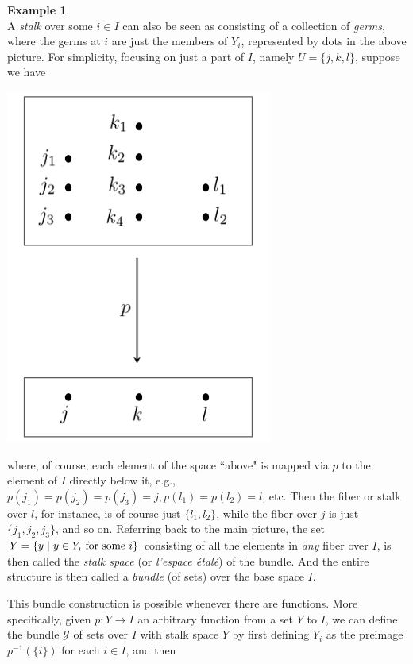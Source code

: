\documentclass[11pt]{book}
\theoremstyle{definition}
\newtheorem{example}{Example}[section]
\theoremstyle{definition}
\theoremstyle{definition}
\theoremstyle{theorem}
\theoremstyle{definition}
\begin{document}
\begin{example}
\begin{equation*}
\end{equation*} 
A \textit{stalk} over some $i \in I$ can also be seen as consisting of a collection of \textit{germs}, where the germs at $i$ are just the members of $Y_i$, represented by dots in the above picture. For simplicity, focusing on just a part of $I$, namely $U = \{j,k,l\}$, suppose we have
\begin{center}
	\includegraphics*[scale=0.27]{FiberThingy.png}
\end{center}
where, of course, each element of the space ``above" is mapped via $p$ to the element of $I$ directly below it, e.g., $p(j_1) = p(j_2) = p(j_3) = j, p(l_1) = p(l_2) = l$, etc. Then the fiber or stalk over $l$, for instance, is of course just $\{l_1, l_2\}$, while the fiber over $j$ is just $\{j_1, j_2, j_3\}$, and so on. Referring back to the main picture, the set $Y = \{y \hspace*{0.3em}| \hspace*{0.3em} y \in Y_i \text{ for some } i\}$ consisting of all the elements in \textit{any} fiber over $I$, is then called the \textit{stalk space} (or \textit{l'espace \'etal\'e}) of the bundle. And the entire structure is then called a \textit{bundle} (of sets) over the base space $I$. \par 
This bundle construction is possible whenever there are functions. More specifically, given $p: Y \rightarrow I$ an arbitrary function from a set $Y$ to $I$, we can define the bundle $\mathscr{Y}$ of sets over $I$ with stalk space $Y$ by first defining $Y_i$ as the preimage $p^{-1}(\{i\})$ for each $i \in I$, and then 

\end{example}
\end{document}

